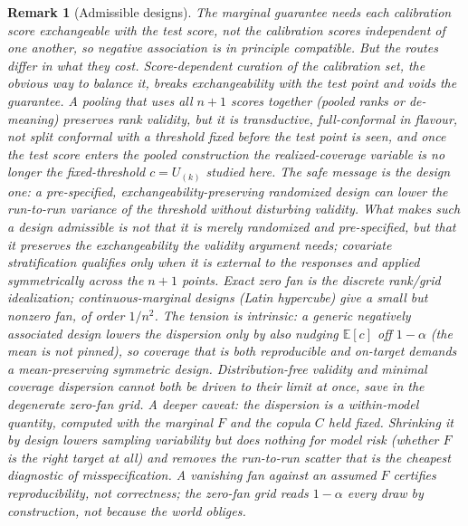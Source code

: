 \documentclass[11pt]{article}
\newtheorem{remark}{Remark}
\begin{document}
\begin{remark}[Admissible designs]
The marginal guarantee needs each calibration score exchangeable with the test score, not the
calibration scores independent of one another, so negative association is in principle compatible. But
the routes differ in what they cost. Score-dependent curation of the calibration set, the obvious way
to balance it, breaks exchangeability with the test point and voids the guarantee. A pooling that uses
all $n+1$ scores together (pooled ranks or de-meaning) preserves rank validity, but it is
transductive, full-conformal in flavour, not split conformal with a threshold fixed before the test
point is seen, and once the test score enters the pooled construction the realized-coverage variable
is no longer the fixed-threshold $c=U_{(k)}$ studied here. The safe message is the design one: a
pre-specified, exchangeability-preserving randomized design can lower the run-to-run variance of the
threshold without disturbing validity. What makes such a design admissible is not that it is merely
randomized and pre-specified, but that it preserves the exchangeability the validity argument needs;
covariate stratification qualifies only when it is external to the responses and applied symmetrically
across the $n+1$ points. Exact zero fan is the discrete rank/grid idealization; continuous-marginal
designs (Latin hypercube) give a small but nonzero fan, of order $1/n^2$. The tension is intrinsic: a
generic negatively associated design lowers the dispersion only by also nudging $\mathbb E[c]$ off
$1-\alpha$ (the mean is not pinned), so coverage that is both reproducible \emph{and} on-target demands
a \emph{mean-preserving} symmetric design. Distribution-free validity and minimal coverage dispersion
cannot both be driven to their limit at once, save in the degenerate zero-fan grid.
A deeper caveat: the dispersion is a \emph{within-model} quantity, computed with the marginal $F$ and
the copula $C$ held fixed. Shrinking it by design lowers sampling variability but does nothing for model risk (whether $F$ is the right target at all) and removes the run-to-run scatter that is
the cheapest diagnostic of misspecification. A vanishing fan against an assumed $F$ certifies
reproducibility, not correctness; the zero-fan grid reads $1-\alpha$ every draw by construction, not
because the world obliges.
\end{remark}
\end{document}
